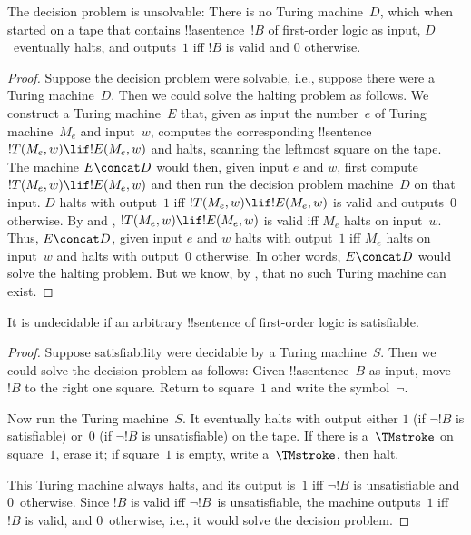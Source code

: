 \documentclass[../../../include/open-logic-section]{subfiles}
\begin{document}

\begin{thm}
The decision problem is unsolvable: There is no Turing machine~$D$,
which when started on a tape that contains !!a{sentence}~$!B$ of
first-order logic as input, $D$~eventually halts, and outputs~$1$ iff
$!B$ is valid and $0$ otherwise.
\end{thm}

\begin{proof}
Suppose the decision problem were solvable, i.e., suppose there were a
Turing machine~$D$. Then we could solve the halting problem as
follows. We construct a Turing machine~$E$ that, given as input the
number~$e$ of Turing machine~$M_e$ and input~$w$, computes the
corresponding !!{sentence}~$!T(M_e, w) \lif !E(M_e, w)$ and halts,
scanning the leftmost square on the tape.  The machine $E \concat D$
would then, given input $e$ and $w$, first compute~$!T(M_e, w) \lif
!E(M_e, w)$ and then run the decision problem machine~$D$ on that
input.  $D$ halts with output~$1$ iff $!T(M_e, w) \lif !E(M_e, w)$ is
valid and outputs~$0$ otherwise. By  and
, $!T(M_e, w) \lif !E(M_e, w)$ is valid
iff $M_e$ halts on input~$w$. Thus, $E\concat D$, given input $e$ and
$w$ halts with output~$1$ iff $M_e$ halts on input~$w$ and halts with
output~$0$ otherwise. In other words, $E \concat D$ would solve the
halting problem.  But we know, by ,
that no such Turing machine can exist.
\end{proof}

\begin{cor}%
It is undecidable if an arbitrary !!{sentence} of first-order logic is satisfiable.
\end{cor}

\begin{proof}
  Suppose satisfiability were decidable by a Turing machine~$S$. Then
  we could solve the decision problem as follows: Given
  !!a{sentence}~$B$ as input, move $!B$ to the right one square.
  Return to square~$1$ and write the symbol~$\lnot$.

  Now run the Turing machine~$S$. It eventually halts with output
  either $1$ (if $\lnot !B$ is satisfiable) or~$0$ (if $\lnot !B$ is
  unsatisfiable) on the tape. If there is a~$\TMstroke$ on square~$1$,
  erase it; if square~$1$ is empty, write a~$\TMstroke$, then halt.

  This Turing machine always halts, and its output is~$1$ iff $\lnot
  !B$ is unsatisfiable and $0$~otherwise. Since $!B$ is valid iff
  $\lnot !B$~is unsatisfiable, the machine outputs~$1$ iff $!B$ is
  valid, and $0$~otherwise, i.e., it would solve the decision problem.
\end{proof}
\end{document}
